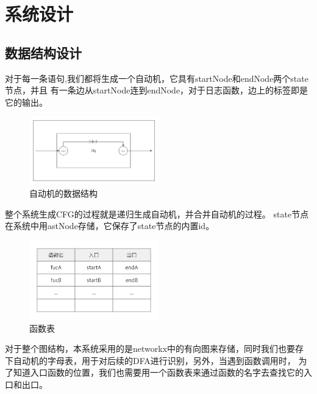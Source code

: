 \chapter{系统设计}

\section{数据结构设计}

对于每一条语句,我们都将生成一个自动机，它具有startNode和endNode两个state节点，并且
有一条边从startNode连到endNode，对于日志函数，边上的标签即是它的输出。
\begin{figure}[htbp]
	\centering
	\includegraphics[width=0.5\textwidth]{pictures/Cfg.png}
	\caption{自动机的数据结构}
	\label{fig:自动机的数据结构}
\end{figure}
整个系统生成CFG的过程就是递归生成自动机，并合并自动机的过程。
state节点在系统中用astNode存储，它保存了state节点的内置id。
\begin{figure}[htbp]
	\centering
	\includegraphics[width=0.5\textwidth]{pictures/fucTable.png}
	\caption{函数表}
	\label{fig:函数表}
\end{figure}
对于整个图结构，本系统采用的是networkx中的有向图来存储，同时我们也要存下自动机的字母表，用于对后续的DFA进行识别，另外，当遇到函数调用时，
为了知道入口函数的位置，我们也需要用一个函数表来通过函数的名字去查找它的入口和出口。
